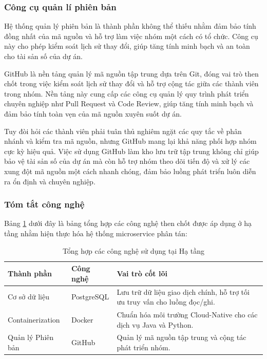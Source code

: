 \subsubsection{Công cụ quản lí phiên bản}

Hệ thống quản lý phiên bản là thành phần không thể thiếu nhằm đảm bảo tính đồng nhất của mã nguồn và hỗ trợ làm việc nhóm một cách có tổ chức. Công cụ này cho phép kiểm soát lịch sử thay đổi, giúp tăng tính minh bạch và an toàn cho tài sản số của dự án.

GitHub là nền tảng quản lý mã nguồn tập trung dựa trên Git, đóng vai trò then chốt trong việc kiểm soát lịch sử thay đổi và hỗ trợ cộng tác giữa các thành viên trong nhóm. Nền tảng này cung cấp các công cụ quản lý quy trình phát triển chuyên nghiệp như Pull Request và Code Review, giúp tăng tính minh bạch và đảm bảo tính toàn vẹn của mã nguồn xuyên suốt dự án.

Tuy đòi hỏi các thành viên phải tuân thủ nghiêm ngặt các quy tắc về phân nhánh và kiểm tra mã nguồn, nhưng GitHub mang lại khả năng phối hợp nhóm cực kỳ hiệu quả. Việc sử dụng GitHub làm kho lưu trữ tập trung không chỉ giúp bảo vệ tài sản số của dự án mà còn hỗ trợ nhóm theo dõi tiến độ và xử lý các xung đột mã nguồn một cách nhanh chóng, đảm bảo luồng phát triển luôn diễn ra ổn định và chuyên nghiệp.

\subsubsection{Tóm tắt công nghệ}

Bảng \ref{tab:infrastructure_summary} dưới đây là bảng tổng hợp các công nghệ then chốt được áp dụng ở hạ tầng nhằm hiện thực hóa hệ thống microservice phân tán:

\begin{table}[H]
\centering
\renewcommand{\arraystretch}{1.4}
\caption{Tổng hợp các công nghệ sử dụng tại Hạ tầng}
\label{tab:infrastructure_summary}
\begin{tabular}{|l|p{4.5cm}|p{6.5cm}|}
\hline
\textbf{Thành phần} & \textbf{Công nghệ} & \textbf{Vai trò cốt lõi} \\ \hline
Cơ sở dữ liệu & PostgreSQL & Lưu trữ dữ liệu giao dịch chính, hỗ trợ tối ưu truy vấn cho luồng đọc/ghi. \\ \hline
Containerization & Docker & Chuẩn hóa môi trường Cloud-Native cho các dịch vụ Java và Python.\\ \hline
Quản lý Phiên bản & GitHub & Quản lý mã nguồn tập trung và cộng tác phát triển nhóm. \\ \hline
\end{tabular}
\end{table}

